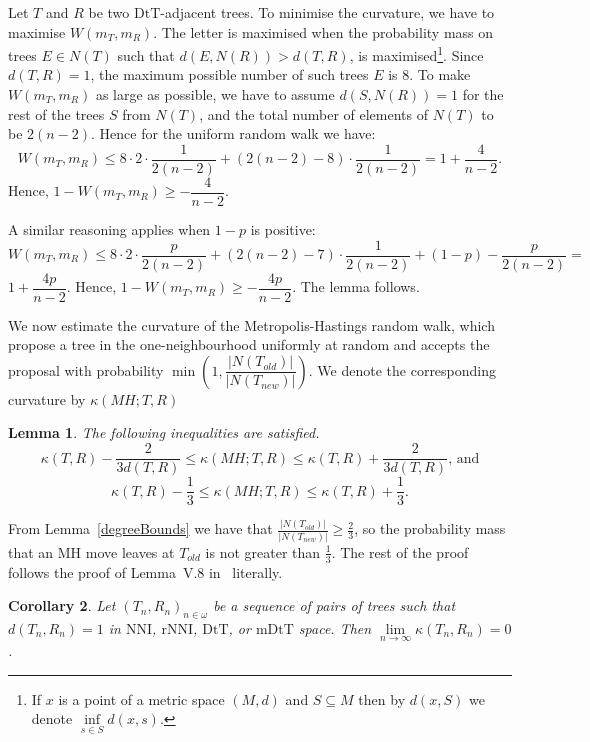 \documentclass{amsart}
\newtheorem{lemma}{Lemma}
\newtheorem{corollary}[lemma]{Corollary}
\newcommand{\dts}{\mathrm{DtT}}
\newcommand{\nni}{\mathrm{NNI}}
\newcommand{\rnni}{\mathrm{rNNI}}
\newcommand{\mdts}{\mathrm{mDtT}}
\begin{document}
\proof
Let $T$ and $R$ be two $\dts$-adjacent trees. To minimise the curvature, we have
to maximise $W(m_T, m_R)$. The letter is maximised when the probability mass
on trees $E\in N(T)$ such that $d(E, N(R)) > d(T, R)$, is 
maximised\footnote{If $x$ is a point of a metric space $(M,d)$ and 
$S \subseteq M$ then by $d(x,S)$ we denote $\inf\limits_{s \in S} d(x,s)$.}. 
Since $d(T, R) = 1$, the maximum possible number of such trees $E$ is 
$8$. To make $W(m_T,m_R)$ as large as possible, we have to assume 
$d(S, N(R)) = 1$ for the rest of the trees $S$ from $N(T)$, and the
total number of elements of $N(T)$ to be $2(n-2)$.
Hence for the uniform random walk we have: 
\[
W(m_T,m_R)\leq 8 \cdot 2 \cdot \frac{1}{2(n - 2)} +
(2(n - 2) - 8) \cdot \frac{1}{2(n-2)} = 1 + \dfrac{4}{n-2}.
\]
Hence, $1 - W(m_T,m_R) \geq - \dfrac{4}{n-2}$. 

A similar reasoning applies when $1-p$ is positive:
\[
W(m_T,m_R)\leq 8 \cdot 2 \cdot \frac{p}{2(n - 2)} + 
(2(n - 2) - 7) \cdot \frac{1}{2(n-2)} + (1-p) - \frac{p}{2(n-2)} =
\]
$1 + \dfrac{4p}{n-2}$. Hence, 
$1 - W(m_T,m_R) \geq - \dfrac{4p}{n-2}$. The lemma follows. 
\endproof

We now estimate the curvature of the Metropolis-Hastings random walk, which 
propose a tree in the one-neighbourhood uniformly at random and 
accepts the proposal with probability 
$\min(1, \dfrac{|N(T_{old})|}{|N(T_{new})|})$. We denote the corresponding 
curvature by $\kappa(MH;T,R)$

\begin{lemma}
The following inequalities are satisfied. 
\[
\kappa(T,R) - \dfrac{2}{3d(T,R)} \leq \kappa(MH;T,R) \leq \kappa(T,R) +
\dfrac{2}{3d(T,R)}\mbox{, and}
\]
\[
\kappa(T,R) - \dfrac13 \leq \kappa(MH;T,R) \leq \kappa(T,R) + \dfrac13.
\]
\end{lemma}

\proof
From Lemma~\ref{degreeBounds} we have that 
$\frac{|N(T_{old})|}{|N(T_{new})|} \geq \frac{2}{3}$, so the probability 
mass that an MH move leaves at $T_{old}$ is not greater than $\frac13$. 
The rest of the
proof follows the proof of Lemma~V.8 in~\cite{Whidden2015-es} literally. 
\endproof

\begin{corollary}\label{flatInLimDTS}
Let $(T_n,R_n)_{n\in\omega}$ be a sequence of pairs of trees such that
$d(T_n,R_n) = 1$ in $\nni$, $\rnni$, $\dts$, or $\mdts$ space.
Then $\lim\limits_{n \to \infty}\kappa(T_n,R_n) = 0$.
\end{corollary}
\end{document}
